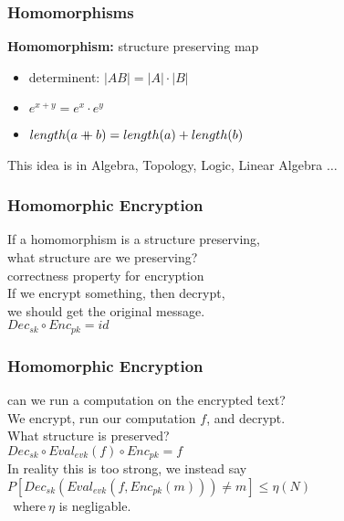 

\begin{frame}
\frametitle{Homomorphisms}
\textbf{Homomorphism:} structure preserving map
\pause
\begin{itemize}
  \item determinent: $|AB| = |A|\cdot |B|$
\pause
  \item $e^{x+y} = e^x\cdot e^y$
\pause
  \item $length (a\mathbin{+\mkern-10mu+} b) = length(a) + length(b)$
\pause
\end{itemize}
$\ $\\
This idea is in Algebra, Topology, Logic, Linear Algebra $\ldots$
\end{frame}

\begin{frame}
\frametitle{Homomorphic Encryption}
If a homomorphism is a structure preserving,\\
what structure are we preserving?\\
\pause
$\ $\\
$\ $\\
correctness property for encryption\\
\pause
$\ $\\
If we encrypt something, then decrypt,\\
we should get the original message.\\
\pause
$\ $\\
$Dec_{sk} \circ Enc_{pk} = id$\\
\end{frame}

\begin{frame}
\frametitle{Homomorphic Encryption}
can we run a computation on the encrypted text?\\
\pause
We encrypt, run our computation $f$, and decrypt.\\
What structure is preserved?\\
$\ $\\
\pause
$Dec_{sk} \circ Eval_{evk}(f) \circ Enc_{pk} = f$\\
$\ $\\
$\ $\\
\pause
In reality this is too strong, we instead say\\
$\ $\\
$P[Dec_{sk} (Eval_{evk}(f, Enc_{pk}(m))) \ne m] \le \eta(N)$\\
$\ \ \text{where}\ \eta$ is negligable.
\end{frame}

